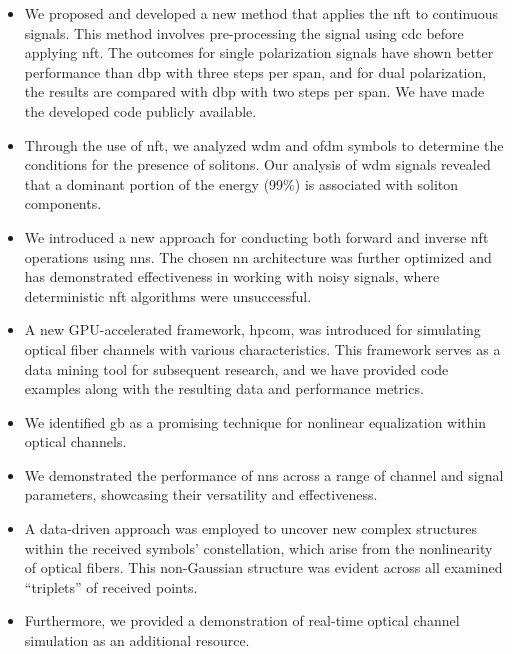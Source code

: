 \begin{itemize}
    \item We proposed and developed a new method that applies the \acrshort{nft} to continuous signals. This method involves pre-processing the signal using \acrfull{cdc} before applying \acrshort{nft}. The outcomes for single polarization signals have shown better performance than \acrfull{dbp} with three steps per span, and for dual polarization, the results are compared with \acrshort{dbp} with two steps per span. We have made the developed code publicly available.
    
    \item Through the use of \acrshort{nft}, we analyzed \gls{wdm} and \gls{ofdm} symbols to determine the conditions for the presence of solitons. Our analysis of \gls{wdm} signals revealed that a dominant portion of the energy (99\%) is associated with soliton components.
    
    \item We introduced a new approach for conducting both forward and inverse \acrshort{nft} operations using \acrshort{nn}s. The chosen \acrshort{nn} architecture was further optimized and has demonstrated effectiveness in working with noisy signals, where deterministic \acrshort{nft} algorithms were unsuccessful.
    
    \item A new GPU-accelerated framework, \acrfull{hpcom}, was introduced for simulating optical fiber channels with various characteristics. This framework serves as a data mining tool for subsequent research, and we have provided code examples along with the resulting data and performance metrics.
    
    \item We identified \gls{gb} as a promising technique for nonlinear equalization within optical channels.
    
    \item We demonstrated the performance of \acrshort{nn}s across a range of channel and signal parameters, showcasing their versatility and effectiveness.
    
    \item A data-driven approach was employed to uncover new complex structures within the received symbols' constellation, which arise from the nonlinearity of optical fibers. This non-Gaussian structure was evident across all examined ``triplets'' of received points.
    
    \item Furthermore, we provided a demonstration of real-time optical channel simulation as an additional resource.
\end{itemize}



